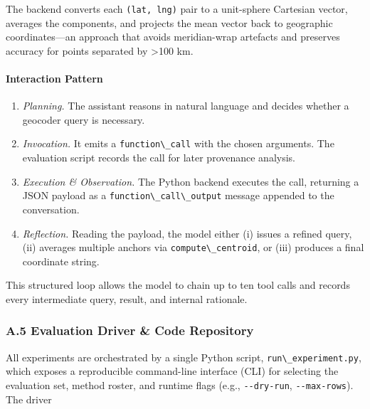 \documentclass[
  10pt,
  twocolumn]{article}
\providecommand{\tightlist}{%
  \setlength{\itemsep}{0pt}\setlength{\parskip}{0pt}}
\begin{document}
The backend converts each \passthrough{\lstinline!(lat, lng)!} pair to a
unit-sphere Cartesian vector, averages the components, and projects the
mean vector back to geographic coordinates---an approach that avoids
meridian-wrap artefacts and preserves accuracy for points separated by
\textgreater100 km.

\paragraph{Interaction Pattern}\label{interaction-pattern}

\begin{enumerate}
\def\labelenumi{\arabic{enumi}.}
\tightlist
\item
  \emph{Planning.} The assistant reasons in natural language and decides
  whether a geocoder query is necessary.
\item
  \emph{Invocation.} It emits a \passthrough{\lstinline!function\_call!}
  with the chosen arguments. The evaluation script records the call for
  later provenance analysis.
\item
  \emph{Execution \& Observation.} The Python backend executes the call,
  returning a JSON payload as a
  \passthrough{\lstinline!function\_call\_output!} message appended to
  the conversation.
\item
  \emph{Reflection.} Reading the payload, the model either (i) issues a
  refined query, (ii) averages multiple anchors via
  \passthrough{\lstinline!compute\_centroid!}, or (iii) produces a final
  coordinate string.
\end{enumerate}

This structured loop allows the model to chain up to ten tool calls and
records every intermediate query, result, and internal rationale.

\subsubsection{A.5 Evaluation Driver \& Code
Repository}\label{a.5-evaluation-driver-code-repository}

All experiments are orchestrated by a single Python script,
\passthrough{\lstinline!run\_experiment.py!}, which exposes a
reproducible command-line interface (CLI) for selecting the evaluation
set, method roster, and runtime flags (e.g.,
\passthrough{\lstinline!--dry-run!},
\passthrough{\lstinline!--max-rows!}). The driver
\end{document}
